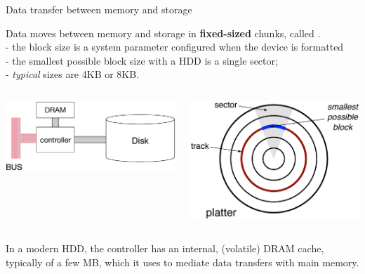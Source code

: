 %
%
\begin{frame}{Data transfer between memory and storage}

Data moves between memory and storage in \textbf{fixed-sized} chunks, called .\\
- the block size is a system parameter configured when the device is formatted\\
- the smallest possible block size with a HDD is a single sector;\\
- \emph{typical} sizes are 4KB or 8KB.

\begin{columns}
\begin{column}{0.35\textwidth}
\includegraphics[width=1.1\textwidth]{figures/HDD_architecture}
\end{column}
\begin{column}{0.35\textwidth}
\includegraphics[width=\textwidth]{figures/HDD_block_size}
\end{column}
\end{columns}

In a modern HDD, the controller has an internal, (volatile) DRAM cache, typically of a few MB, which it uses to mediate data transfers with main memory.

\end{frame}


